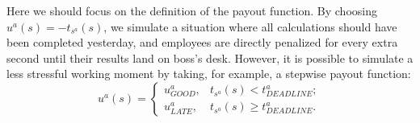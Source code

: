 Here we should focus on the definition of the payout function. By choosing $u^a(s) = -t_{s^a}(s)$, we simulate a situation where all calculations should have been completed yesterday, and employees are directly penalized for every extra second until their results land on boss's desk. However, it is possible to simulate a less stressful working moment by taking, for example, a stepwise payout function: %
\begin{equation*}%
	u^a(s) = \begin{cases}
		u^a_{GOOD}, &t_{s^a}(s) < t^a_{DEADLINE};\\
		u^a_{LATE}, &t_{s^a}(s) \ge t^a_{DEADLINE}.
	\end{cases}
\end{equation*}

